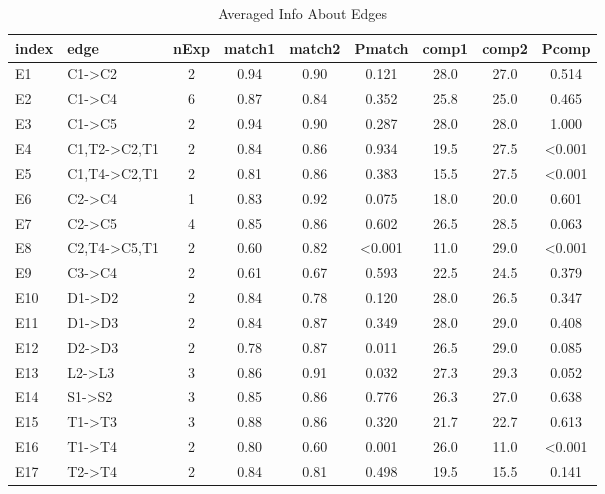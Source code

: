 \begin{table*}\begin{small}\begin{center}\caption{Averaged Info About Edges}\label{table:testedEdgesTable}\begin{tabular}
{llccccccc}
index & edge & nExp & match1 & match2 & Pmatch & comp1 & comp2 & Pcomp \\
\toprule[0.16em]
E1 & C1->C2 & 2 & 0.94 & 0.90 & 0.121 & 28.0 & 27.0 & 0.514\\
E2 & C1->C4 & 6 & 0.87 & 0.84 & 0.352 & 25.8 & 25.0 & 0.465\\
E3 & C1->C5 & 2 & 0.94 & 0.90 & 0.287 & 28.0 & 28.0 & 1.000\\
E4 & C1,T2->C2,T1 & 2 & 0.84 & 0.86 & 0.934 & 19.5 & 27.5 & <0.001\\
E5 & C1,T4->C2,T1 & 2 & 0.81 & 0.86 & 0.383 & 15.5 & 27.5 & <0.001\\
E6 & C2->C4 & 1 & 0.83 & 0.92 & 0.075 & 18.0 & 20.0 & 0.601\\
E7 & C2->C5 & 4 & 0.85 & 0.86 & 0.602 & 26.5 & 28.5 & 0.063\\
E8 & C2,T4->C5,T1 & 2 & 0.60 & 0.82 & <0.001 & 11.0 & 29.0 & <0.001\\
E9 & C3->C4 & 2 & 0.61 & 0.67 & 0.593 & 22.5 & 24.5 & 0.379\\
E10 & D1->D2 & 2 & 0.84 & 0.78 & 0.120 & 28.0 & 26.5 & 0.347\\
E11 & D1->D3 & 2 & 0.84 & 0.87 & 0.349 & 28.0 & 29.0 & 0.408\\
E12 & D2->D3 & 2 & 0.78 & 0.87 & 0.011 & 26.5 & 29.0 & 0.085\\
E13 & L2->L3 & 3 & 0.86 & 0.91 & 0.032 & 27.3 & 29.3 & 0.052\\
E14 & S1->S2 & 3 & 0.85 & 0.86 & 0.776 & 26.3 & 27.0 & 0.638\\
E15 & T1->T3 & 3 & 0.88 & 0.86 & 0.320 & 21.7 & 22.7 & 0.613\\
E16 & T1->T4 & 2 & 0.80 & 0.60 & 0.001 & 26.0 & 11.0 & <0.001\\
E17 & T2->T4 & 2 & 0.84 & 0.81 & 0.498 & 19.5 & 15.5 & 0.141\\
\bottomrule[0.13em]\end{tabular}\end{center}\end{small}\end{table*}
